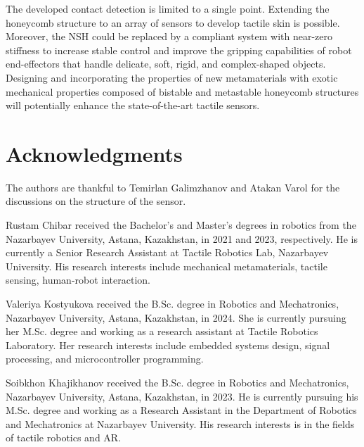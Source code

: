 \documentclass[lettersize,journal]{IEEEtran}
\begin{document}
The developed contact detection is limited to a single point. Extending the honeycomb structure to an array of sensors to develop tactile skin is possible. Moreover, the NSH could be replaced by a compliant system with near-zero stiffness to increase stable control and improve the gripping capabilities of robot end-effectors that handle delicate, soft, rigid, and complex-shaped objects. %
Designing and incorporating the properties of new metamaterials with exotic mechanical properties composed of bistable and metastable honeycomb structures will potentially enhance the state-of-the-art tactile sensors. %
\section*{Acknowledgments}
The authors are thankful to Temirlan Galimzhanov and Atakan Varol for the discussions on the structure of the sensor.

 
\begin{IEEEbiography} {Rustam Chibar} received the Bachelor's and Master's degrees in robotics from the Nazarbayev University, Astana, Kazakhstan, in 2021 and 2023, respectively. He is currently a Senior Research Assistant at Tactile Robotics Lab, Nazarbayev University. His research interests include mechanical metamaterials, tactile sensing, human-robot interaction.\end{IEEEbiography}

\begin{IEEEbiography} {Valeriya Kostyukova} received the B.Sc. degree in Robotics and Mechatronics, Nazarbayev University, Astana, Kazakhstan, in 2024. She is currently pursuing her M.Sc. degree and working as a research assistant at Tactile Robotics Laboratory. Her research interests include embedded systems design, signal processing, and microcontroller programming. 
\end{IEEEbiography}

\begin{IEEEbiography} {Soibkhon Khajikhanov} received the B.Sc. degree in Robotics and Mechatronics, Nazarbayev University, Astana, Kazakhstan, in 2023. He is currently pursuing his M.Sc. degree and working as a Research Assistant in the Department of Robotics and Mechatronics at Nazarbayev University. His research interests is in the fields of tactile robotics and AR.\end{IEEEbiography}
\end{document}
